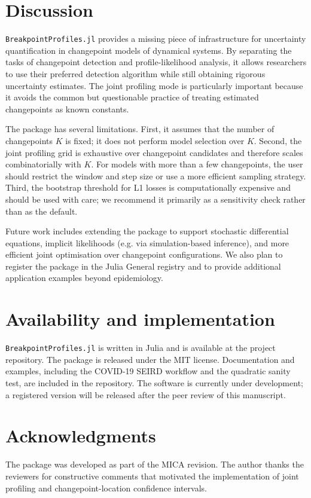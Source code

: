 \documentclass[10pt,letterpaper]{article}
\begin{document}
\section*{Discussion}
\texttt{BreakpointProfiles.jl} provides a missing piece of infrastructure for uncertainty quantification in changepoint models of dynamical systems. By separating the tasks of changepoint detection and profile-likelihood analysis, it allows researchers to use their preferred detection algorithm while still obtaining rigorous uncertainty estimates. The joint profiling mode is particularly important because it avoids the common but questionable practice of treating estimated changepoints as known constants.

The package has several limitations. First, it assumes that the number of changepoints $K$ is fixed; it does not perform model selection over $K$. Second, the joint profiling grid is exhaustive over changepoint candidates and therefore scales combinatorially with $K$. For models with more than a few changepoints, the user should restrict the window and step size or use a more efficient sampling strategy. Third, the bootstrap threshold for L1 losses is computationally expensive and should be used with care; we recommend it primarily as a sensitivity check rather than as the default.

Future work includes extending the package to support stochastic differential equations, implicit likelihoods (e.g. via simulation-based inference), and more efficient joint optimisation over changepoint configurations. We also plan to register the package in the Julia General registry and to provide additional application examples beyond epidemiology.

\section*{Availability and implementation}
\texttt{BreakpointProfiles.jl} is written in Julia and is available at the project repository. The package is released under the MIT license. Documentation and examples, including the COVID-19 SEIRD workflow and the quadratic sanity test, are included in the repository. The software is currently under development; a registered version will be released after the peer review of this manuscript.

\section*{Acknowledgments}
The package was developed as part of the MICA revision. The author thanks the reviewers for constructive comments that motivated the implementation of joint profiling and changepoint-location confidence intervals.

\nolinenumbers


\end{document}
